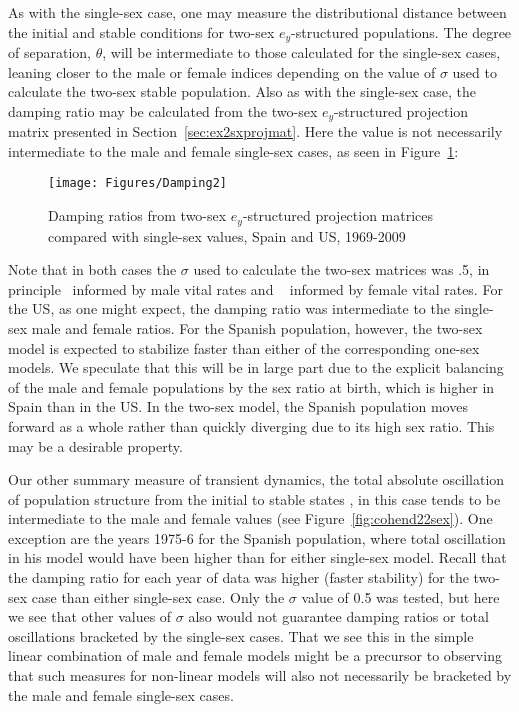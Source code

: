  \FloatBarrier
As with the single-sex case, one may measure the distributional distance between
the initial and stable conditions for two-sex $e_y$-structured populations. The
degree of separation, $\theta$, will be intermediate to those calculated for the 
single-sex cases, leaning closer to the male or
female indices depending on the value of $\sigma$ used to calculate the two-sex
stable population. Also as with the single-sex case, the damping
ratio may be calculated from the two-sex $e_y$-structured projection matrix 
presented in Section~\ref{sec:ex2sxprojmat}. Here the value is not
necessarily intermediate to the male and female single-sex cases, as seen in
Figure~\ref{fig:damping2}:

\begin{figure}[ht!]
        \centering  
          \caption{Damping ratios from two-sex $e_y$-structured projection
          matrices compared with single-sex values, Spain and US, 1969-2009}
           \texttt{[image: Figures/Damping2]}
          \label{fig:damping2}
\end{figure}
Note that in both cases the $\sigma$ used to calculate the two-sex matrices was
.5, in principle \textonehalf~informed by male vital rates and \textonehalf~
informed by female vital rates. For the US, as one might expect, the damping
ratio was intermediate to the single-sex male and female ratios. For
the Spanish population, however, the two-sex model is expected to stabilize
faster than either of the corresponding one-sex models. We speculate that this
will be in large part due to the explicit balancing of the male and female
populations by the sex ratio at birth, which is higher in Spain than in the US. 
In the two-sex model, the Spanish population moves forward as a whole rather 
than quickly diverging due to its high sex ratio. This may be a desirable
property.

Our other summary measure of transient dynamics, the total absolute
oscillation of population structure from the initial to stable states
\citep{cohen1979cumulative}, in this case tends to be intermediate to the male
and female values (see Figure~\ref{fig:cohend22sex}). One exception are the
years 1975-6 for the Spanish population, where total oscillation in his model
would have been higher than for either single-sex model. Recall that the damping
ratio for each year of data was higher (faster stability) for the two-sex case 
than either single-sex case. Only the $\sigma$ value of 0.5 was tested, but here
we see that other values of $\sigma$ also would not guarantee damping ratios or
total oscillations bracketed by the single-sex cases. That we see this in the
simple linear combination of male and female models might be a precursor to
observing that such measures for non-linear models will also not necessarily be
bracketed by the male and female single-sex cases.

